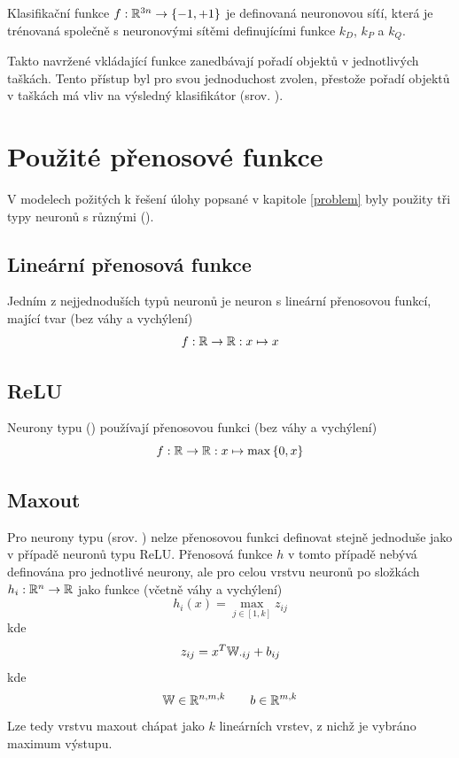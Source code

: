 Klasifikační funkce \( f : \mathbb R^{3n} \to \left\{ -1, +1 \right\} \) je definovaná neuronovou síťí, která je trénovaná společně s neuronovými sítěmi definujícími funkce \( k_D \), \( k_P \) a \( k_Q \).

Takto navržené vkládající funkce zanedbávají pořadí objektů v jednotlivých taškách. Tento přístup byl pro svou jednoduchost zvolen, přestože pořadí objektů v taškách má vliv na výsledný klasifikátor (srov. \cite{vinyals_order_2015}).

\section{Použité přenosové funkce}
V modelech požitých k řešení úlohy popsané v kapitole \ref{problem} byly použity tři typy neuronů s různými  ().

\subsection{Lineární přenosová funkce}
Jedním z nejjednoduších typů neuronů je neuron s lineární přenosovou funkcí, mající tvar (bez váhy a vychýlení)
\[ f : \mathbb R \to \mathbb R : x \mapsto x \]

\subsection{ReLU}
Neurony typu  () používají přenosovou funkci (bez váhy a vychýlení)
\[ f : \mathbb R \to \mathbb R : x \mapsto \max \left\{ 0, x \right\} \]

\subsection{Maxout}
Pro neurony typu  (srov. \cite{goodfellow_maxout_2013}) nelze přenosovou funkci definovat stejně jednoduše jako v případě neuronů typu ReLU. Přenosová funkce \( h \) v tomto případě nebývá definována pro jednotlivé neurony, ale pro celou vrstvu neuronů po složkách \( h_i : \mathbb R^n \to \mathbb R \) jako funkce (včetně váhy a vychýlení)
\[ h_i \left( x \right) = \max_{j \in \left[ 1, k \right]} z_{ij} \]
kde
\[ z_{ij} = x^T \mathbb W_{\cdot ij} + b_{ij} \]
kde
\[ \mathbb W \in \mathbb R^{n, m, k} \qquad b \in \mathbb R^{m, k} \]
Lze tedy vrstvu maxout chápat jako \( k \) lineárních vrstev, z nichž je vybráno maximum výstupu.

